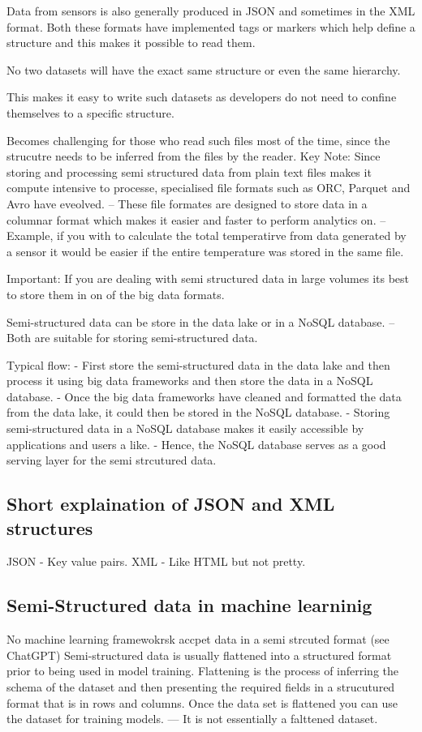 \documentclass[11pt]{article}
\begin{document}
    Data from sensors is also generally produced in JSON and sometimes in the XML format.
    Both these formats have implemented tags or markers which help define a structure and this makes it possible to read them.

    No two datasets will have the exact same structure or even the same hierarchy.

    This makes it easy to write such datasets as developers do not need to confine themselves to a specific structure.

    Becomes challenging for those who read such files most of the time, since the strucutre needs to be inferred from the files by the reader.
    Key Note: Since storing and processing semi structured data from plain text files makes it compute intensive to processe, specialised file formats such as ORC, Parquet and Avro have eveolved.
    -- These file formates are designed to store data in a columnar format which makes it easier and faster to perform analytics on.
    -- Example, if you with to calculate the total temperatirve from data generated by a sensor it would be easier if the entire temperature was stored in the same file.

    Important: If you are dealing with semi structured data in large volumes its best to store them in on of the big data formats.

    Semi-structured data can be store in the data lake or in a NoSQL database.
    -- Both are suitable for storing semi-structured data.

    Typical flow:
    - First store the semi-structured data in the data lake and then process it using big data frameworks and then store the data in a NoSQL database.
    - Once the big data frameworks have cleaned and formatted the data from the data lake, it could then be stored in the NoSQL database.
    - Storing semi-structured data in a NoSQL database makes it easily accessible by applications and users a like.
    - Hence, the NoSQL database serves as a good serving layer for the semi strcutured data.

    \subsection{Short explaination of JSON and XML structures}
    JSON - Key value pairs.
    XML - Like HTML but not pretty.
    
    \subsection{Semi-Structured data in machine learninig}
    No machine learning framewokrsk accpet data in a semi strcuted format (see ChatGPT)
    Semi-structured data is usually flattened into a structured format prior to being used in model training.
    Flattening is the process of inferring the schema of the dataset and then presenting the required fields in a strucutured format that is in rows and columns.
    Once the data set is flattened you can use the dataset for training models.
    --- It is not essentially a falttened dataset.
\end{document}
